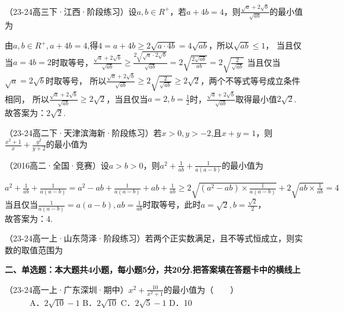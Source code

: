 \documentclass[11pt,a4paper]{ctexbook}
\begin{document}
\begin{hmwk}
    （23-24高三下·江西·阶段练习）设$a,b\in R^+$，若$a+4b=4$，则$\displaystyle \frac{\sqrt{a}+2\sqrt{b}}{\sqrt{ab}}$的最小值为
    \begin{jiexi}
        由$a,b\in R^+,a+4b=4$,得$4=a+4b\ge2\sqrt{a \cdot 4b}=4\sqrt{ab}$，所以$\sqrt{ab}\le 1$，
当且仅当$a=4b=2$时取等号，$\displaystyle \frac{\sqrt{a}+2\sqrt{b}}{\sqrt{ab}}\ge \frac{2\sqrt{\sqrt{a}\cdot 2\sqrt{b}}}{\sqrt{ab}}=
2\sqrt{\frac{2\sqrt{ab}}{ab}}=2\sqrt{\frac{2}{\sqrt{ab}}}$
当且仅当$\sqrt{a}=2\sqrt{b}$时取等号，
所以$\displaystyle \frac{\sqrt{a}+2\sqrt{b}}{\sqrt{ab}}\ge2\sqrt{\frac{2}{\sqrt{ab}}}\ge2\sqrt{2}$，两个不等式等号成立条件相同，
所以$\displaystyle \frac{\sqrt{a}+2\sqrt{b}}{\sqrt{ab}}\ge2\sqrt{2}$，当且仅当$\displaystyle a=2,b=\frac{1}{2}$时，$\displaystyle \frac{\sqrt{a}+2\sqrt{b}}{\sqrt{ab}}$取得最小值$2\sqrt{2}$.\\
故答案为：$2\sqrt{2}$.
    \end{jiexi}
\end{hmwk}

\begin{hmwk}
    （23-24高二下·天津滨海新·阶段练习）若$x>0,y>-2$,且$x+y=1$，则$\frac{x^2+1}{x}+\frac{y^2}{y+2}$的最小值为
\end{hmwk}

\begin{hmwk}
    （2016高二·全国·竞赛）设$a>b>0$，则$\displaystyle a^2+\frac{1}{ab}+\frac{1}{a(a-b)}$的最小值为
    \begin{jiexi}
        $\displaystyle a^2+\frac{1}{ab}+\frac{1}{a(a-b)}=a^2-ab+\frac{1}{a(a-b)}+ab+\frac{1}{ab}\ge 2\sqrt{(a^2-ab)\times \frac{1}{a(a-b)}}+2\sqrt{ab\times\frac{1}{ab}}=4$\\
        当且仅当$\frac{1}{a(a-b)}=a(a-b),ab=\frac{1}{ab}$时取等号，此时$\displaystyle a=\sqrt{2},b=\frac{\sqrt{2}}{2}$，\\
故答案为：4.
    \end{jiexi}
\end{hmwk}

\begin{hmwk}
    （23-24高一上·山东菏泽·阶段练习）若两个正实数满足，且不等式恒成立，则实数的取值范围为
\end{hmwk}
\textbf{二、单选题：本大题共4小题，每小题5分，共20分.把答案填在答题卡中的横线上}
\begin{hmwk}
    （23-24高一上·广东深圳·期中）$\displaystyle x^2+\frac{10}{x^2+1}$的最小值为（    ）\\
          A．$2\sqrt{10}-1$ \quad\quad	B．$2\sqrt{10}$ \quad\quad	C．$2\sqrt{5}-1$ \quad\quad	D．10
\end{hmwk}
\end{document}

